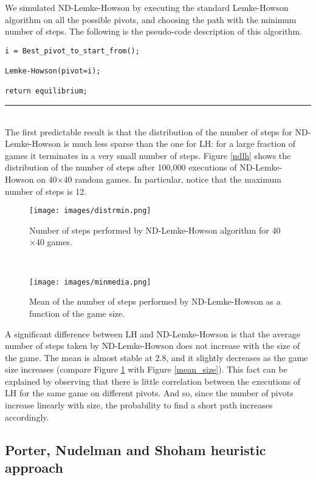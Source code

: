 \documentclass[11pt]{article}
\begin{document}
We simulated ND-Lemke-Howson by executing
the standard Lemke-Howson algorithm on all the possible pivots, 
and choosing the path with the minimum
number of steps. The following is the pseudo-code description of
this algorithm.

\noindent
\makebox[\textwidth]{\hrulefill}
\begin{verbatim}
i = Best_pivot_to_start_from();

Lemke-Howson(pivot=i);

return equilibrium;
\end{verbatim}
\hrule\hfill\\

The first predictable result is that the distribution of the number
of steps for ND-Lemke-Howson is much less sparse than the one for
LH: for a large fraction of games it terminates in a very small
number of steps. Figure \ref{ndlh} shows the distribution of the
number of steps after 100,000 executions of ND-Lemke-Howson on
40$\times$40 random games. In particular, notice that the maximum
number of steps is 12.

\begin{figure}[h]
\begin{minipage}[t]{6.1cm}
\centering
\texttt{[image: images/distrmin.png]}
\caption{Number of steps performed by ND-Lemke-Howson algorithm for
40$\times$40 games.} \label{ndlh}
\end{minipage}
\ \hspace{3mm} \hspace{4mm}\
\begin{minipage}[t]{6.1cm}
\centering
\texttt{[image: images/minmedia.png]}
\caption{Mean of the number of steps performed by
ND-Lemke-Howson as a function of the game size.}
\label{mean_size_nd}
\end{minipage}
\end{figure}

A significant difference between LH and ND-Lemke-Howson is that the
average number of steps taken by ND-Lemke-Howson does not increase
with the size of the game. The mean is almost stable at 2.8, and it
slightly decreases as the game size increases (compare Figure
\ref{mean_size_nd} with Figure \ref{mean_size}). This fact can be
explained by observing that there is little correlation between the
executions of LH for the same game on different pivots. And so,
since the number of pivots increase linearly with size, the
probability to find a short path increases accordingly.

\subsection{Porter, Nudelman and Shoham heuristic approach}
\end{document}
